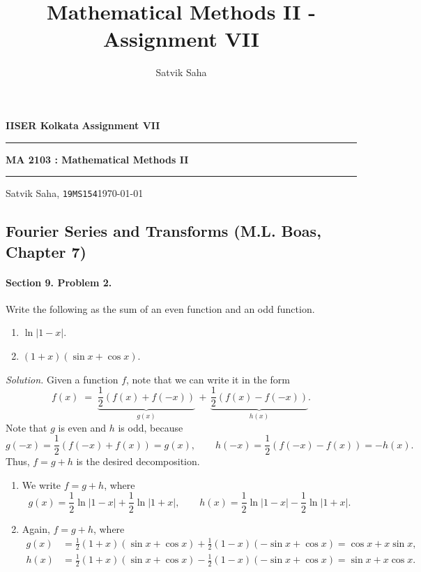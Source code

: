 \documentclass[10pt]{article}
\title{Mathematical Methods II - Assignment VII}
\author{Satvik Saha}
\date{}
\begin{document}
        \par\textbf{IISER Kolkata} \hfill \textbf{Assignment VII}
        \vspace{3pt}
        \hrule
        \vspace{3pt}
        \begin{center}
                \LARGE{\textbf{MA 2103 : Mathematical Methods II}}
        \end{center}
        \vspace{3pt}
        \hrule
        \vspace{3pt}
        Satvik Saha, \texttt{19MS154}\hfill\today
        \vspace{20pt}
        \subsection*{Fourier Series and Transforms (M.L. Boas, Chapter 7)}

        \paragraph{Section 9. Problem 2.} Write the following as the sum of an even function and an odd function.
        \begin{enumerate}
                \item $\ln|1-x|$.
                \item $(1 + x)(\sin{x} + \cos{x})$.
        \end{enumerate}

        \textit{Solution.} Given a function $f$, note that we can write it in the form
        \[
                f(x) \;=\; \underbrace{\frac{1}{2}(f(x) + f(-x))}_{g(x)} \,+\, \underbrace{\frac{1}{2}(f(x) - f(-x))}_{h(x)}.
        \]
        Note that $g$ is even and $h$ is odd, because
        \[
                g(-x) = \frac{1}{2}(f(-x) + f(x)) = g(x), \qquad h(-x) = \frac{1}{2}(f(-x) - f(x)) = -h(x).
        \]
        Thus, $f = g + h$ is the desired decomposition.
        \begin{enumerate}
                \item We write $f = g + h$, where
                \[
                        g(x) = \frac{1}{2}\ln|1 - x| + \frac{1}{2}\ln|1 + x|, \qquad h(x) = \frac{1}{2}\ln|1 - x| - \frac{1}{2}\ln|1 + x|.
                \]
                \item Again, $f = g + h$, where
                \begin{align*}
                        g(x) &= \frac{1}{2}(1 + x)(\sin{x} + \cos{x}) + \frac{1}{2}(1 - x)(-\sin{x} + \cos{x}) = \cos{x} + x\sin{x}, \\
                        h(x) &= \frac{1}{2}(1 + x)(\sin{x} + \cos{x}) - \frac{1}{2}(1 - x)(-\sin{x} + \cos{x}) = \sin{x} + x\cos{x}.
                \end{align*}
        \end{enumerate}
\end{document}
